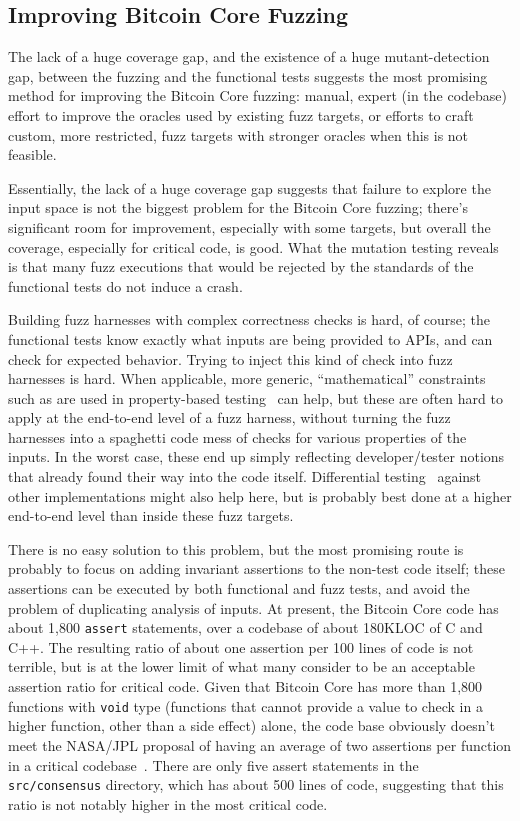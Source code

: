 \subsection{Improving Bitcoin Core Fuzzing}

The lack of a huge coverage gap, and the existence of a huge
mutant-detection gap, between the fuzzing and the functional tests
suggests the most promising method for improving the Bitcoin Core
fuzzing: manual, expert (in the codebase) effort to improve the
oracles used by existing fuzz targets, or efforts to craft custom,
more restricted, fuzz targets with stronger oracles when this is not
feasible.

Essentially, the lack of a huge coverage gap suggests that failure to
explore the input space is not the biggest problem for the Bitcoin
Core fuzzing; there's significant room for improvement, especially
with some targets, but overall the coverage, especially for critical
code, is good.  What the mutation testing reveals is that many fuzz
executions that would be rejected by the standards of the functional
tests do not induce a crash.

Building fuzz harnesses with complex correctness checks is hard, of
course; the functional tests know exactly what inputs are being
provided to APIs, and can check for expected behavior.  Trying to
inject this kind of check into fuzz harnesses is hard.  When
applicable, more generic, ``mathematical'' constraints such as are
used in property-based testing~\cite{ClaessenH00} can help, but these
are often hard to apply at the end-to-end level of a fuzz harness,
without turning the fuzz harnesses into a spaghetti code mess of
checks for various properties of the inputs.  In the worst case, these
end up simply reflecting developer/tester notions that already found
their way into the code itself.  Differential testing~\cite{Differential} against other
implementations might also help here, but is probably best done at a
higher end-to-end level than inside these fuzz targets.

There is no
easy solution to this problem, but the most promising route is
probably to focus
on adding invariant assertions to the non-test code itself; these assertions can be executed by
both functional and fuzz tests, and avoid the problem of duplicating
analysis of inputs.  At
present, the Bitcoin Core code has about 1,800 {\tt assert}
statements, over a codebase of about 180KLOC of C and C++.  The resulting ratio
of about one assertion per 100 lines of code is not terrible, but is
at the lower limit of what many consider to be an acceptable assertion
ratio for critical code.
Given that Bitcoin Core has more than 1,800 functions with {\tt void}
type (functions that cannot provide a value to check in a higher
function, other than a side effect) alone, the code base obviously
doesn't meet the NASA/JPL proposal of having an average of two
assertions per function in a critical
codebase~\cite{holzmann2006power}.  There are only five assert
statements in the {\tt src/consensus} directory, which has about 500
lines of code, suggesting that this ratio is not notably higher in the
most critical code.

